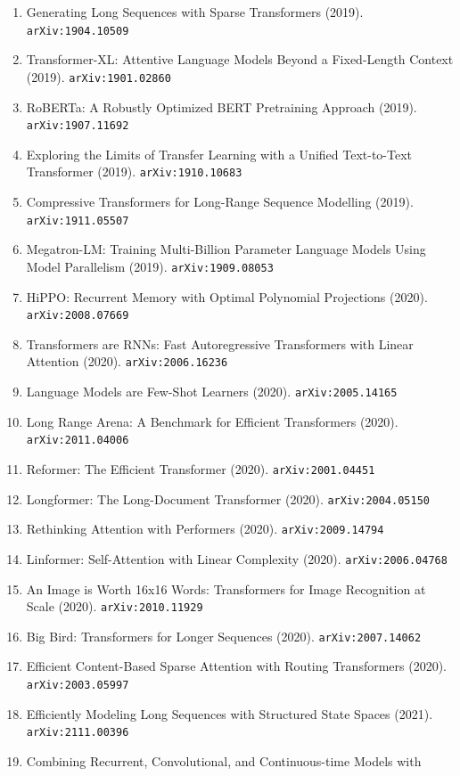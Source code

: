 \documentclass[11pt]{article}
\begin{document}
\begin{enumerate}
  Challenge (2018). \texttt{arXiv:1803.05457}
  \item Generating Long Sequences with Sparse Transformers (2019). \texttt{arXiv:1904.10509}
  \item Transformer-XL: Attentive Language Models Beyond a Fixed-Length Context (2019). \texttt{arXiv:1901.02860}
  \item RoBERTa: A Robustly Optimized BERT Pretraining Approach (2019). \texttt{arXiv:1907.11692}
  \item Exploring the Limits of Transfer Learning with a Unified Text-to-Text
  Transformer (2019). \texttt{arXiv:1910.10683}
  \item Compressive Transformers for Long-Range Sequence Modelling (2019). \texttt{arXiv:1911.05507}
  \item Megatron-LM: Training Multi-Billion Parameter Language Models Using
  Model Parallelism (2019). \texttt{arXiv:1909.08053}
  \item HiPPO: Recurrent Memory with Optimal Polynomial Projections (2020). \texttt{arXiv:2008.07669}
  \item Transformers are RNNs: Fast Autoregressive Transformers with Linear
  Attention (2020). \texttt{arXiv:2006.16236}
  \item Language Models are Few-Shot Learners (2020). \texttt{arXiv:2005.14165}
  \item Long Range Arena: A Benchmark for Efficient Transformers (2020). \texttt{arXiv:2011.04006}
  \item Reformer: The Efficient Transformer (2020). \texttt{arXiv:2001.04451}
  \item Longformer: The Long-Document Transformer (2020). \texttt{arXiv:2004.05150}
  \item Rethinking Attention with Performers (2020). \texttt{arXiv:2009.14794}
  \item Linformer: Self-Attention with Linear Complexity (2020). \texttt{arXiv:2006.04768}
  \item An Image is Worth 16x16 Words: Transformers for Image Recognition at
  Scale (2020). \texttt{arXiv:2010.11929}
  \item Big Bird: Transformers for Longer Sequences (2020). \texttt{arXiv:2007.14062}
  \item Efficient Content-Based Sparse Attention with Routing Transformers (2020). \texttt{arXiv:2003.05997}
  \item Efficiently Modeling Long Sequences with Structured State Spaces (2021). \texttt{arXiv:2111.00396}
  \item Combining Recurrent, Convolutional, and Continuous-time Models with

\end{enumerate}
\end{document}

